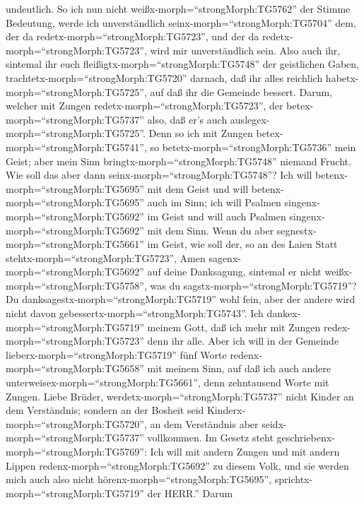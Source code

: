 undeutlich.  So ich nun nicht
weißx-morph=``strongMorph:TG5762'' der Stimme Bedeutung, werde ich
unverständlich seinx-morph=``strongMorph:TG5704'' dem, der da
redetx-morph=``strongMorph:TG5723'', und der da
redetx-morph=``strongMorph:TG5723'', wird mir unverständlich sein.
 Also auch ihr, sintemal ihr euch
fleißigtx-morph=``strongMorph:TG5748'' der geistlichen Gaben,
trachtetx-morph=``strongMorph:TG5720'' darnach, daß ihr alles reichlich
habetx-morph=``strongMorph:TG5725'', auf daß ihr die Gemeinde bessert.
 Darum, welcher mit Zungen
redetx-morph=``strongMorph:TG5723'', der
betex-morph=``strongMorph:TG5737'' also, daß er's auch
auslegex-morph=``strongMorph:TG5725''.  Denn so ich mit
Zungen betex-morph=``strongMorph:TG5741'', so
betetx-morph=``strongMorph:TG5736'' mein Geist; aber mein Sinn
bringtx-morph=``strongMorph:TG5748'' niemand Frucht.  Wie
soll das aber dann seinx-morph=``strongMorph:TG5748''? Ich will
betenx-morph=``strongMorph:TG5695'' mit dem Geist und will
betenx-morph=``strongMorph:TG5695'' auch im Sinn; ich will Psalmen
singenx-morph=``strongMorph:TG5692'' im Geist und will auch Psalmen
singenx-morph=``strongMorph:TG5692'' mit dem Sinn.  Wenn du
aber segnestx-morph=``strongMorph:TG5661'' im Geist, wie soll der, so an
des Laien Statt stehtx-morph=``strongMorph:TG5723'', Amen
sagenx-morph=``strongMorph:TG5692'' auf deine Danksagung, sintemal er
nicht weißx-morph=``strongMorph:TG5758'', was du
sagstx-morph=``strongMorph:TG5719''?  Du
danksagestx-morph=``strongMorph:TG5719'' wohl fein, aber der andere wird
nicht davon gebessertx-morph=``strongMorph:TG5743''.  Ich
dankex-morph=``strongMorph:TG5719'' meinem Gott, daß ich mehr mit Zungen
redex-morph=``strongMorph:TG5723'' denn ihr alle.  Aber ich
will in der Gemeinde lieberx-morph=``strongMorph:TG5719'' fünf Worte
redenx-morph=``strongMorph:TG5658'' mit meinem Sinn, auf daß ich auch
andere unterweisex-morph=``strongMorph:TG5661'', denn zehntausend Worte
mit Zungen.  Liebe Brüder,
werdetx-morph=``strongMorph:TG5737'' nicht Kinder an dem Verständnis;
sondern an der Bosheit seid Kinderx-morph=``strongMorph:TG5720'', an dem
Verständnis aber seidx-morph=``strongMorph:TG5737'' vollkommen.
 Im Gesetz steht geschriebenx-morph=``strongMorph:TG5769'':
Ich will mit andern Zungen und mit andern Lippen
redenx-morph=``strongMorph:TG5692'' zu diesem Volk, und sie werden mich
auch also nicht hörenx-morph=``strongMorph:TG5695'',
sprichtx-morph=``strongMorph:TG5719'' der HERR.''  Darum
